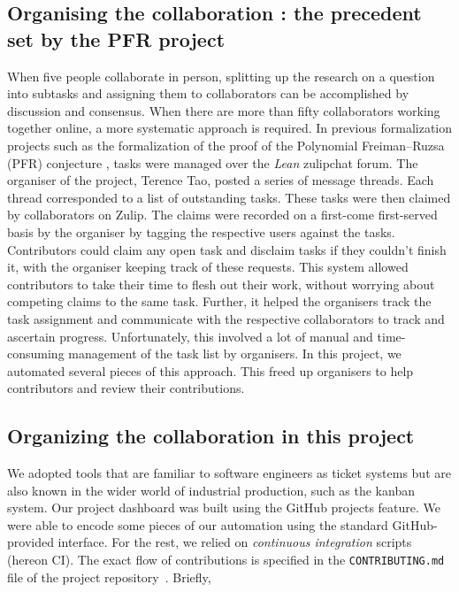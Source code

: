 \subsection{Organising the collaboration : the precedent set by the PFR project}
When five people collaborate in person, splitting up the research on a question into subtasks and assigning them to collaborators can be accomplished by discussion and consensus. When there are more than fifty collaborators working together online, a more systematic approach is required. In previous formalization projects such as the formalization of the proof of the Polynomial Freiman--Ruzsa (PFR) conjecture \cite{PFR_Tao_Dilles_2023}, tasks were managed over the \emph{Lean} zulipchat forum. The organiser of the project, Terence Tao, posted a series of message threads. Each thread corresponded to a list of outstanding tasks. These tasks were then claimed by collaborators on Zulip. The claims were recorded on a first-come first-served basis by the organiser by tagging the respective users against the tasks. Contributors could claim any open task and disclaim tasks if they couldn't finish it, with the organiser keeping track of these requests. This system allowed contributors to take their time to flesh out their work, without worrying about competing claims to the same task. Further, it helped the organisers track the task assignment and communicate with the respective collaborators to track and ascertain progress. Unfortunately, this involved a lot of manual and time-consuming management of the task list by organisers. In this project, we automated several pieces of this approach. This freed up organisers to help contributors and review their contributions.

\subsection{Organizing the collaboration in this project}
We adopted tools that are familiar to software engineers as ticket systems but are also known in the wider world of industrial production, such as the kanban system. Our project dashboard was built using the GitHub projects feature. We were able to encode some pieces of our automation using the standard GitHub-provided interface. For the rest, we relied on \emph{continuous integration} scripts (hereon CI\@). The exact flow of contributions is specified in the \texttt{CONTRIBUTING.md} file of the project repository~\cite{The_Equational_Theories_repository}. Briefly,


